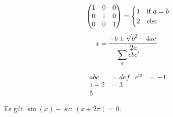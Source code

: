 \documentclass{article}
\begin{document}
\[
  \begin{pmatrix}
    1 & 0 & 0 \\
    0 & 1 & 0 \\
    0 & 0 & 1
  \end{pmatrix}
  =
  \begin{cases}
    1 & $if $a=b\\
    2 & $else$
  \end{cases}
\]
\[
  x = \frac{-b \pm \sqrt{b^2-4ac}}{2a}.
\]
\[
  \sum_a\underline c\dot bc'
\]

\begin{align}
  abc&=def & e^{\mathrm{i}\pi}&=-1\\
  1+2&=3\\
  5
\end{align}

Es gilt $\sin(x)-\sin(x+2\pi)=0$.
\end{document}
